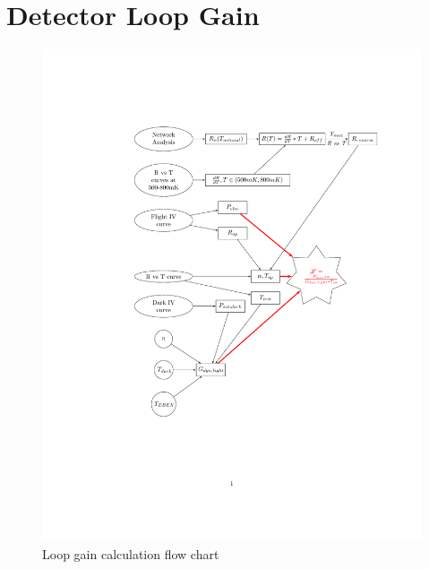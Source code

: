 %
%
%
%
\section{Detector Loop Gain}
\label{sec:loop_gain}

\begin{figure}[htbp]
\begin{center}
\includegraphics[width=1.0 \textwidth]{figures/loopgain_flowchart.pdf}
\caption{Loop gain calculation flow chart}
\label{fig:loopgain_flow}
\end{center}
\end{figure}

